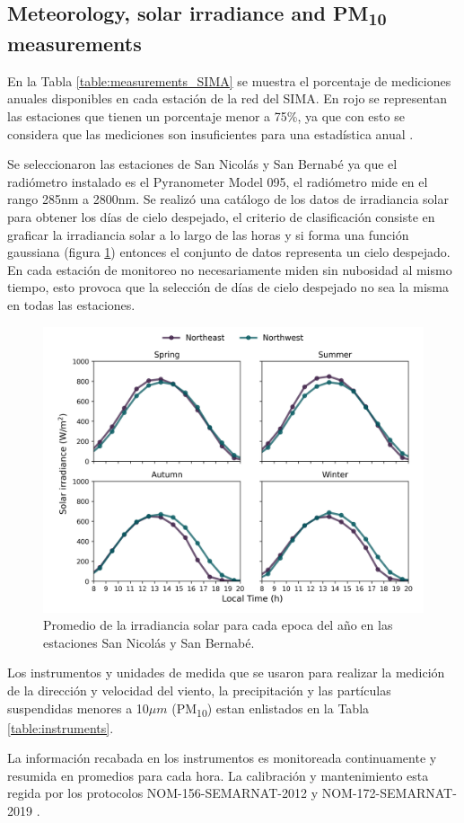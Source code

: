 \subsection{Meteorology, solar irradiance and PM\textsubscript{10} measurements}
En la Tabla \ref{table:measurements_SIMA} se muestra el porcentaje de mediciones anuales disponibles en cada estación de la red del SIMA. En rojo se representan las estaciones que tienen un porcentaje menor a 75\%, ya que con esto se considera que las mediciones son insuficientes para una estadística anual \cite{molina2019}.

Se seleccionaron las estaciones de San Nicolás y San Bernabé ya que el radiómetro instalado es el Pyranometer Model 095, el radiómetro mide en el rango 285nm a 2800nm. Se realizó una catálogo de los datos de irradiancia solar para obtener los días de cielo despejado, el criterio de clasificación consiste en graficar la irradiancia solar a lo largo de las horas y si forma una función gaussiana (figura \ref{fig:clear_days}) entonces el conjunto de datos representa un cielo despejado. En cada estación de monitoreo no necesariamente miden sin nubosidad al mismo tiempo, esto provoca que la selección de días de cielo despejado no sea la misma en todas las estaciones.
\begin{figure}[H]
    \centering
    \includegraphics[scale=0.5]{images/Clear_days.png}
    \caption{Promedio de la irradiancia solar para cada epoca del año en las estaciones San Nicolás y San Bernabé.}
    \label{fig:clear_days}
\end{figure}
Los instrumentos y unidades de medida que se usaron para realizar la medición de la dirección y velocidad del viento, la precipitación y las partículas suspendidas menores a 10$\mu m$ (PM\textsubscript{10}) estan enlistados en la Tabla \ref{table:instruments}.

La información recabada en los instrumentos es monitoreada continuamente y resumida en promedios para cada hora. La calibración y mantenimiento esta regida por los protocolos NOM-156-SEMARNAT-2012 \cite{SEMARNAT2012} y NOM-172-SEMARNAT-2019 \cite{SEMARNAT2019}.